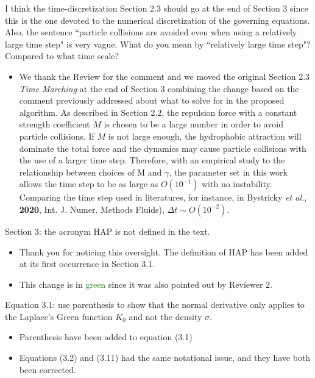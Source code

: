 \documentclass[11pt]{article}
\newcommand{\comment}[1]{{\color{blue} #1}}
\begin{document}
\noindent
\comment{I think the time-discretization Section 2.3 should go at the
end of Section 3 since this is the one devoted to the numerical
discretization of the governing equations. Also, the sentence ``particle
collisions are avoided even when using a relatively large time step" is
very vague.  What do you mean by ``relatively large time step"? Compared
to what time scale?}
\begin{itemize}
  \item We thank the Review for the comment and we moved the original Section 2.3 {\it Time Marching} at the end of Section 3 combining the change based on the comment previously addressed about what to solve for in the proposed algorithm. 
As described in Section 2.2, the repulsion force with a constant strength coefficient $M$ is chosen 
to be a large number in order to avoid particle collisions. If $M$ is not large enough, the hydrophobic attraction will dominate the total force and the dynamics may cause particle collisions with the use of a larger time step. Therefore, with an empirical study to the relationship between 
choices of M and $\gamma$, the parameter set in this work allows the time step to be as large as
$O(10^{-1})$ with no instability. Comparing the time step used in literatures, for instance, in Bystricky {\sl et al.}, {\bf 2020}, Int. J. Numer. Methods Fluids), $\Delta t\sim O(10^{-2})$.
\end{itemize}

\noindent
\comment{Section 3: the acronym HAP is not defined in the text.}
\begin{itemize}
  \item Thank you for noticing this oversight. The definition of HAP has
    been added at its first occurrence in Section 3.1. 
  \item This change is in \textcolor{green}{green} since it was also pointed
    out by Reviewer 2.
\end{itemize}

\noindent
\comment{Equation 3.1: use parenthesis to show that the normal
derivative only applies to the Laplace’s Green function $K_0$ and not
the density $\sigma$.}
\begin{itemize}
  \item Parenthesis have been added to equation (3.1) 

  \item Equations (3.2) and (3.11) had the same notational issue, and
    they have both been corrected.
\end{itemize}
\end{document}
